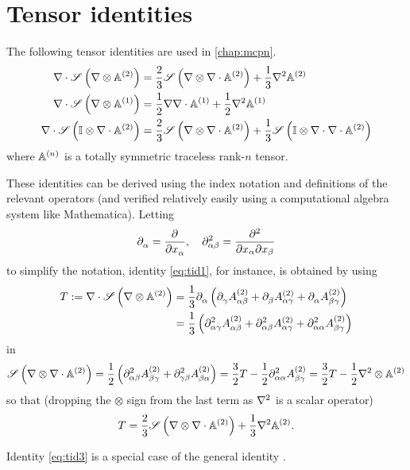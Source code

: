 \chapter{Tensor identities}\label{app:F}
The following tensor identities are used in \cref{chap:mcpn}.
\begin{align}
\label{eq:tid1}
	\div\Sym{\del\otimes\AA[2]} &= \frac23 \Sym{\del\otimes\div\AA[2]} + \frac13 \lap\AA[2]\\
\label{eq:tid2}
	\div\Sym{\del\otimes\AA[1]} &= \frac12 \del\div\AA[1] + \frac12 \lap\AA[1]\\
\label{eq:tid3}
	\div\Sym{\eye\otimes\div\AA[2]} &= \frac23 \Sym{\del\otimes\div\AA[2]} + \frac13\Sym{\eye\otimes\div\div\AA[2]} 
\end{align}
where
$\AA[n]$ is a totally symmetric traceless rank-$n$ tensor. 

These identities can be derived using the index notation and definitions of the relevant operators  (and
verified relatively easily using a computational algebra system like Mathematica). Letting
$$
	\spd{}{\alpha} = \pd{}{x_\alpha},\quad \spd[2]{}{\alpha\beta} = \pdd[2]{}{\partial x_\alpha \partial x_\beta}
$$
to simplify the notation, identity \eqref{eq:tid1}, for instance, is obtained by using
$$
\begin{aligned}
	T := \div\Sym{\del\otimes\AA[2]} &= \frac{1}{3}\spd{}{\alpha}
	\left(
		\spd{\AAAA{\alpha\beta}}{\gamma} + \spd{\AAAA{\alpha\gamma}}{\beta} + \spd{\AAAA{\beta\gamma}}{\alpha}
	\right)\\
	&= \frac13 \left(
		\spd[2]{\AAAA{\alpha\beta}}{\alpha \gamma} + 
		\spd[2]{\AAAA{\alpha\gamma}}{\alpha \beta} +
		\spd[2]{\AAAA{\beta\gamma}}{\alpha \alpha} 
	\right)
\end{aligned}
$$
in
$$
	\Sym{\del\otimes\div\AA[2]} = \frac12\left(\spd[2]{\AAAA{\beta\gamma}}{\alpha\beta}	+
	\spd[2]{\AAAA{\beta\alpha}}{\gamma\beta} \right)  = \frac32 T - \frac12 \spd[2]{\AAAA{\beta\gamma}}{\alpha \alpha} =
	\frac32 T - \frac12 \lap \otimes \AA[2]
$$ 
so that (dropping the $\otimes$ sign from the last term as $\lap$ is a scalar operator)
$$
	T = \frac23 \Sym{\del\otimes\div\AA[2]} + \frac13 \lap\AA[2].
$$

Identity \eqref{eq:tid3} is a special case of the general identity \cite[B.4]{Coppa3}. 
